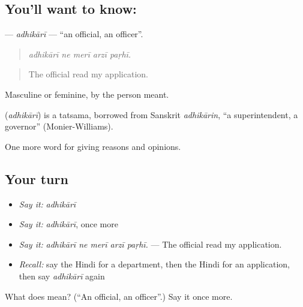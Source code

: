 \subsection*{You'll want to know: }
\textbf{} — \emph{adhikārī} — \textquotedblleft{}an official, an officer\textquotedblright{}.

\begin{quote}
    
\end{quote}

\begin{quote}
\emph{adhikārī ne merī arzī paṛhī.}
\end{quote}

\begin{quote}
The official read my application.
\end{quote}

Masculine or feminine, by the person meant.

\begin{cousinweb}
\textbf{} (\emph{adhikārī}) is a tatsama, borrowed from Sanskrit \emph{adhikārin}, \textquotedblleft{}a superintendent, a governor\textquotedblright{} (Monier-Williams).
\end{cousinweb}

\begin{grammarlens}[title={What you've built}]
One more word for giving reasons and opinions.
\end{grammarlens}

\subsection*{Your turn}
\begin{itemize}
\raggedright
  \item \emph{Say it:} \emph{adhikārī}
  \item \emph{Say it:} \emph{adhikārī}, once more
  \item \emph{Say it:} \emph{adhikārī ne merī arzī paṛhī.} — The official read my application.
  \item \emph{Recall:} say the Hindi for a department, then the Hindi for an application, then say \emph{adhikārī} again
\end{itemize}

\begin{tcolorbox}[breakable,colback=teal!4,colframe=teal!35!black,title={Before you move on}]
What does  mean? (\textquotedblleft{}An official, an officer\textquotedblright{}.) Say it once more.
\end{tcolorbox}
